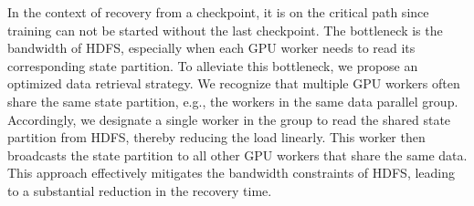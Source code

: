 In the context of recovery from a checkpoint, it is on the critical path since
training can not be started without the last checkpoint. The bottleneck is the
bandwidth of HDFS, especially when each GPU worker needs to read its
corresponding state partition. To alleviate this bottleneck, we propose an
optimized data retrieval strategy. We recognize that multiple GPU workers often
share the same state partition, e.g., the workers in the same data parallel
group. Accordingly, we designate a single worker in the group to read the shared
state partition from HDFS, thereby reducing the load linearly. This worker then
broadcasts the state partition to all other GPU workers that share the same
data. This approach effectively mitigates the bandwidth constraints of HDFS,
leading to a substantial reduction in the recovery time.